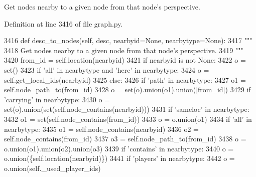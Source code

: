 \begin{DoxyVerb}Get nodes nearby to a given node from that node's perspective.
\end{DoxyVerb}
 

Definition at line 3416 of file graph.\+py.


\begin{DoxyCode}
3416     \textcolor{keyword}{def }desc\_to\_nodes(self, desc, nearbyid=None, nearbytype=None):
3417         \textcolor{stringliteral}{"""}
3418 \textcolor{stringliteral}{        Get nodes nearby to a given node from that node's perspective.}
3419 \textcolor{stringliteral}{        """}
3420         from\_id = self.location(nearbyid)
3421         \textcolor{keywordflow}{if} nearbyid \textcolor{keywordflow}{is} \textcolor{keywordflow}{not} \textcolor{keywordtype}{None}:
3422             o = set()
3423             \textcolor{keywordflow}{if} \textcolor{stringliteral}{'all'} \textcolor{keywordflow}{in} nearbytype \textcolor{keywordflow}{and} \textcolor{stringliteral}{'here'} \textcolor{keywordflow}{in} nearbytype:
3424                 o = self.get\_local\_ids(nearbyid)
3425             \textcolor{keywordflow}{else}:
3426                 \textcolor{keywordflow}{if} \textcolor{stringliteral}{'path'} \textcolor{keywordflow}{in} nearbytype:
3427                     o1 = self.node\_path\_to(from\_id)
3428                     o = set(o).union(o1).union([from\_id])
3429                 \textcolor{keywordflow}{if} \textcolor{stringliteral}{'carrying'} \textcolor{keywordflow}{in} nearbytype:
3430                     o = set(o).union(set(self.node\_contains(nearbyid)))
3431                 \textcolor{keywordflow}{if} \textcolor{stringliteral}{'sameloc'} \textcolor{keywordflow}{in} nearbytype:
3432                     o1 = set(self.node\_contains(from\_id))
3433                     o = o.union(o1)
3434                 \textcolor{keywordflow}{if} \textcolor{stringliteral}{'all'} \textcolor{keywordflow}{in} nearbytype:
3435                     o1 = self.node\_contains(nearbyid)
3436                     o2 = self.node\_contains(from\_id)
3437                     o3 = self.node\_path\_to(from\_id)
3438                     o = o.union(o1).union(o2).union(o3)
3439                 \textcolor{keywordflow}{if} \textcolor{stringliteral}{'contains'} \textcolor{keywordflow}{in} nearbytype:
3440                     o = o.union(\{self.location(nearbyid)\})
3441                 \textcolor{keywordflow}{if} \textcolor{stringliteral}{'players'} \textcolor{keywordflow}{in} nearbytype:
3442                     o = o.union(self.\_used\_player\_ids)

\end{DoxyCode}
